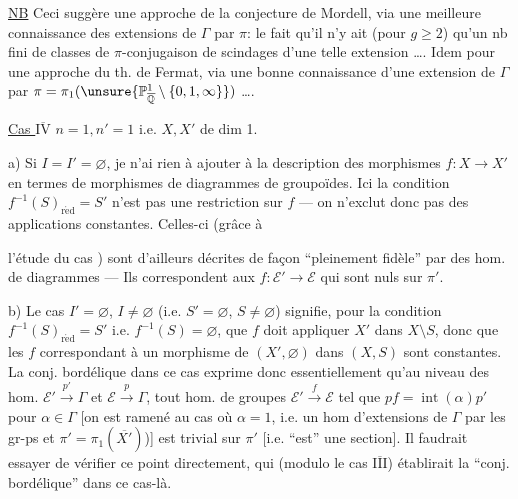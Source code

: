 

\uline{NB} Ceci suggère une approche de la conjecture de Mordell, via une meilleure connaissance des extensions de $\Gamma$ par $\pi$: le fait qu'il n'y ait (pour $g\ge2$) qu'un nb fini de classes de $\pi$-conjugaison de scindages d'une telle extension \ldots.
Idem pour une approche du th. de Fermat, via  une bonne connaissance d'une extension de $\Gamma$ par $\pi=\pi_1(\unsure{\mathbb P^1_{\overline{\mathbb Q}}\setminus\{0,1,\infty\}})$ \ldots.

\uline{Cas $\overline{\mathrm{IV}}$} $n=1,n'=1$ i.e. $X,X'$ de dim 1.

a) Si $I=I'=\varnothing$, je n'ai rien à ajouter à la description des morphismes $f:X\to X'$ en termes de morphismes de diagrammes de groupoïdes. Ici  la condition $f^{-1}(S)_{\mathrm{r\acute ed}}=S'$ n'est pas une restriction sur $f$ ---  on n'exclut donc pas des applications constantes. Celles-ci (grâce à



l'étude du cas \uline{}) sont d'ailleurs décrites de façon ``pleinement fidèle'' par des hom. de diagrammes --- Ils correspondent aux  $f:\mathcal E'\to\mathcal E$ qui sont nuls sur $\pi'$.

b) Le cas $I'=\varnothing$, $I\ne\varnothing$ (i.e. $S'=\varnothing$, $S\ne\varnothing$) signifie, pour la condition $f^{-1}(S)_{\mathrm{r\acute ed}}=S'$ i.e. $f^{-1}(S)=\varnothing$, que $f$ doit appliquer $X'$ dans $X\setminus S$,  donc que les $f$ correspondant à un morphisme de $(X',\varnothing)$ dans $(X,S)$ sont constantes.
La conj. bordélique dans ce cas exprime donc  essentiellement qu'au niveau des hom. $\mathcal E'\xrightarrow{p'}\Gamma$ et $\mathcal E\xrightarrow{p}\Gamma$, tout hom. de groupes $\mathcal E'\xrightarrow{f}\mathcal E$ tel que $pf=\operatorname{int}(\alpha)p'$ pour $\alpha\in\Gamma$ [on est ramené au cas où $\alpha=1$,  i.e. un hom d'extensions de $\Gamma$ par les gr-ps  et $\pi'=\pi_1(\overline{X'})$)] est trivial sur $\pi'$ [i.e. ``est'' une section]. Il faudrait essayer de vérifier ce point directement, qui (modulo le cas \uline{$\overline{\mathrm{III}}$}) établirait la ``conj. bordélique'' dans ce cas-là.

